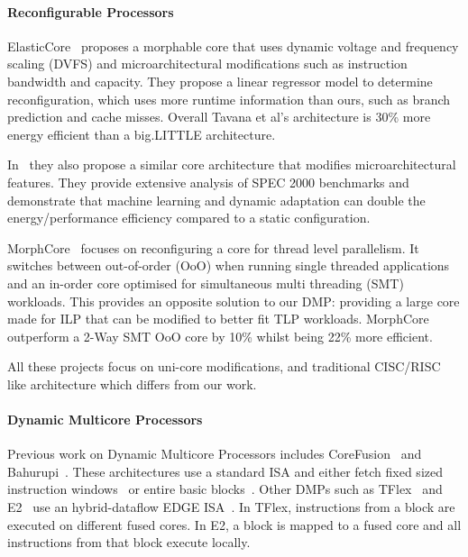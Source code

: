 
\paragraph{Reconfigurable Processors}

ElasticCore~\cite{tavanaElastic} proposes a morphable core that uses dynamic voltage and frequency scaling (DVFS) and microarchitectural modifications such as instruction bandwidth and capacity.
They propose a linear regressor model to determine reconfiguration, which uses more runtime information than ours, such as branch prediction and cache misses.
Overall Tavana et al's architecture is 30\% more energy efficient than a big.LITTLE architecture.

In~\cite{dubach13dynamic} they also propose a similar core architecture that modifies microarchitectural features.
They provide extensive analysis of SPEC 2000 benchmarks and demonstrate that machine learning and dynamic adaptation can double the energy/performance efficiency compared to a static configuration.

MorphCore~\cite{khubaibMorphCore2012} focuses on reconfiguring a core for thread level parallelism.
It switches between out-of-order (OoO) when running single threaded applications and an in-order core optimised for simultaneous multi threading (SMT) workloads.
This provides an opposite solution to our DMP: providing a large core made for ILP that can be modified to better fit TLP workloads.
MorphCore outperform a 2-Way SMT OoO core by 10\% whilst being 22\% more efficient.

All these projects focus on uni-core modifications, and traditional CISC/RISC like architecture which differs from our work.

\vspace{-0.5em}
\paragraph{Dynamic Multicore Processors}
Previous work on Dynamic Multicore Processors includes CoreFusion~\cite{ipek2007CoreFusion} and Bahurupi~\cite{pricopi2012bahurupi,pricopiSchedCoreComp2014}.
These architectures use a standard ISA and either fetch fixed sized instruction windows~\cite{ipek2007CoreFusion} or entire basic blocks~\cite{pricopi2012bahurupi}.
Other DMPs such as TFlex~\cite{kim2007tflex} and E2~\cite{e2} use an hybrid-dataflow EDGE ISA~\cite{burger04edge}. 
In TFlex, instructions from a block are executed on different fused cores.
In E2, a block is mapped to a fused core and all instructions from that block execute locally.

